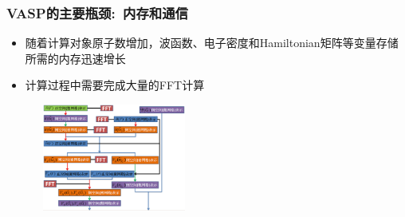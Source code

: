 \frame
{
	\frametitle{\textrm{VASP}的主要瓶颈:~内存和通信}
\begin{itemize}
	\item 随着计算对象原子数增加，波函数、电子密度和\textrm{Hamiltonian}矩阵等变量存储所需的内存迅速增长
	\item 计算过程中需要完成大量的\textrm{FFT}计算\\
		{\fontsize{7.2pt}{5.2pt}}
\end{itemize}
\begin{figure}[h!]
	\vspace{-0.20in}
\centering
\includegraphics[height=1.39in,width=1.98in,viewport=0 0 800 600,clip]{Figures/dual_grid-2.png}

\end{figure}}
